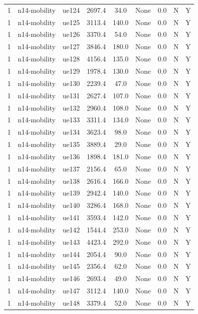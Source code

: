 \begin{table}[ht]
\begin{tabular}{|c|c|c|c|c|c|c|c|c|}
1 & n14-mobility & ue124 & 2697.4 & 34.0 & None & 0.0 & N & Y \\
1 & n14-mobility & ue125 & 3113.4 & 140.0 & None & 0.0 & N & Y \\
1 & n14-mobility & ue126 & 3370.4 & 54.0 & None & 0.0 & N & Y \\
1 & n14-mobility & ue127 & 3846.4 & 180.0 & None & 0.0 & N & Y \\
1 & n14-mobility & ue128 & 4156.4 & 135.0 & None & 0.0 & N & Y \\
1 & n14-mobility & ue129 & 1978.4 & 130.0 & None & 0.0 & N & Y \\
1 & n14-mobility & ue130 & 2239.4 & 47.0 & None & 0.0 & N & Y \\
1 & n14-mobility & ue131 & 2627.4 & 107.0 & None & 0.0 & N & Y \\
1 & n14-mobility & ue132 & 2960.4 & 108.0 & None & 0.0 & N & Y \\
1 & n14-mobility & ue133 & 3311.4 & 134.0 & None & 0.0 & N & Y \\
1 & n14-mobility & ue134 & 3623.4 & 98.0 & None & 0.0 & N & Y \\
1 & n14-mobility & ue135 & 3889.4 & 29.0 & None & 0.0 & N & Y \\
1 & n14-mobility & ue136 & 1898.4 & 181.0 & None & 0.0 & N & Y \\
1 & n14-mobility & ue137 & 2156.4 & 65.0 & None & 0.0 & N & Y \\
1 & n14-mobility & ue138 & 2616.4 & 166.0 & None & 0.0 & N & Y \\
1 & n14-mobility & ue139 & 2942.4 & 140.0 & None & 0.0 & N & Y \\
1 & n14-mobility & ue140 & 3286.4 & 168.0 & None & 0.0 & N & Y \\
1 & n14-mobility & ue141 & 3593.4 & 142.0 & None & 0.0 & N & Y \\
1 & n14-mobility & ue142 & 1544.4 & 253.0 & None & 0.0 & N & Y \\
1 & n14-mobility & ue143 & 4423.4 & 292.0 & None & 0.0 & N & Y \\
1 & n14-mobility & ue144 & 2054.4 & 90.0 & None & 0.0 & N & Y \\
1 & n14-mobility & ue145 & 2356.4 & 62.0 & None & 0.0 & N & Y \\
1 & n14-mobility & ue146 & 2693.4 & 49.0 & None & 0.0 & N & Y \\
1 & n14-mobility & ue147 & 3112.4 & 140.0 & None & 0.0 & N & Y \\
1 & n14-mobility & ue148 & 3379.4 & 52.0 & None & 0.0 & N & Y \\

\end{tabular}
\end{table}
